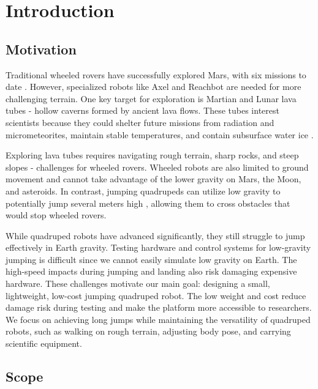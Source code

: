 \section{Introduction}
\label{sec:introduction}

\subsection{Motivation}
\label{sec:motivation}

Traditional wheeled rovers have successfully explored Mars, with six missions to date \cite{mars_rovers_x6}. However, specialized robots like Axel \cite{Axel} and Reachbot \cite{ReachBot} are needed for more challenging terrain. One key target for exploration is Martian and Lunar lava tubes \cite{lavatubes} - hollow caverns formed by ancient lava flows. These tubes interest scientists because they could shelter future missions from radiation and micrometeorites, maintain stable temperatures, and contain subsurface water ice \cite{lavatubes}.

Exploring lava tubes requires navigating rough terrain, sharp rocks, and steep slopes - challenges for wheeled rovers. Wheeled robots are also limited to ground movement and cannot take advantage of the lower gravity on Mars, the Moon, and asteroids. In contrast, jumping quadrupeds can utilize low gravity to potentially jump several meters high \cite{OLYMPUS2}, allowing them to cross obstacles that would stop wheeled rovers.

While quadruped robots have advanced significantly, they still struggle to jump effectively in Earth gravity. Testing hardware and control systems for low-gravity jumping is difficult since we cannot easily simulate low gravity on Earth. The high-speed impacts during jumping and landing also risk damaging expensive hardware. These challenges motivate our main goal: designing a small, lightweight, low-cost jumping quadruped robot. The low weight and cost reduce damage risk during testing and make the platform more accessible to researchers. We focus on achieving long jumps while maintaining the versatility of quadruped robots, such as walking on rough terrain, adjusting body pose, and carrying scientific equipment.

\subsection{Scope}
\label{sec:scope}

